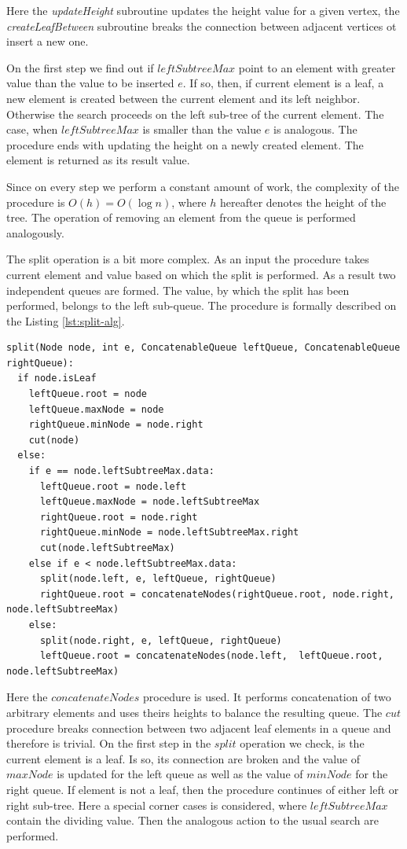 \documentclass[twoside,twocolumn,10pt]{article}
\begin{document}
		Here the \textit{updateHeight} subroutine updates the height value for a given vertex, the \textit{createLeafBetween} subroutine breaks the connection between adjacent vertices ot insert a new one.

		On the first step we find out if $leftSubtreeMax$ point to an element with greater value than the value to be inserted $e$. If so, then, if current element is a leaf, a new element is created between the current element and its left neighbor. Otherwise the search proceeds on the left sub-tree of the current element. The case, when $leftSubtreeMax$ is smaller than the value $e$ is analogous. The procedure ends with updating the height on a newly created element. The element is returned as its result value.

		Since on every step we perform a constant amount of work, the complexity of the procedure is $O(h)=O(\log n)$, where $h$ hereafter denotes the height of the tree. The operation of removing an element from the queue is performed analogously. 

		The split operation is a bit more complex. As an input the procedure takes current element and value based on which the split is performed. As a result two independent queues are formed. The value, by which the split has been performed, belongs to the left sub-queue. The procedure is formally described on the Listing \ref{lst:split-alg}.

		\begin{lstlisting}[caption={Queue split algorithm},label={lst:split-alg},captionpos=b]
split(Node node, int e, ConcatenableQueue leftQueue, ConcatenableQueue rightQueue):
  if node.isLeaf
    leftQueue.root = node
    leftQueue.maxNode = node
    rightQueue.minNode = node.right
    cut(node)
  else:
    if e == node.leftSubtreeMax.data:
      leftQueue.root = node.left
      leftQueue.maxNode = node.leftSubtreeMax
      rightQueue.root = node.right
      rightQueue.minNode = node.leftSubtreeMax.right
      cut(node.leftSubtreeMax)
    else if e < node.leftSubtreeMax.data:
      split(node.left, e, leftQueue, rightQueue)
      rightQueue.root = concatenateNodes(rightQueue.root, node.right, node.leftSubtreeMax)
    else:
      split(node.right, e, leftQueue, rightQueue)
      leftQueue.root = concatenateNodes(node.left,  leftQueue.root, node.leftSubtreeMax)
		\end{lstlisting}

		Here the $concatenateNodes$ procedure is used. It performs concatenation of two arbitrary elements and uses theirs heights to balance the resulting queue. The $cut$ procedure breaks connection between two adjacent leaf elements in a queue and therefore is trivial. On the first step in the $split$ operation we check, is the current element is a leaf. Is so, its connection are broken and the value of $maxNode$ is updated for the left queue as well as the value of $minNode$ for the right queue. If element is not a leaf, then the procedure continues of either left or right sub-tree. Here a special corner cases is considered, where $leftSubtreeMax$ contain the dividing value. Then the analogous action to the usual search are performed.
\end{document}
